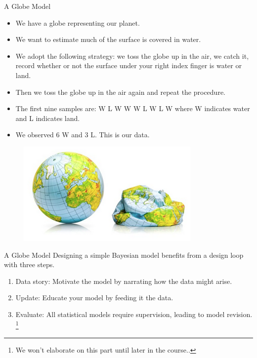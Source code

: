 \documentclass[handout]{beamer}
\begin{document}
\begin{frame}{A Globe Model}
\scriptsize{
\begin{itemize}

\item We have a globe representing our planet. 
\item We want to estimate much of the surface is covered in water. 
\item We adopt the following strategy: we toss the globe up in the air, we catch it, record whether or not the surface under your right index finger is water or
land. 
\item Then we toss the globe up in the air again and repeat the procedure.
\item The first nine samples are:
W L W W W L W L W
where W indicates water and L indicates land.
\item We observed 6 W and 3 L. This is our data.
\end{itemize}
 } 
 
\scriptsize{
\begin{figure}[h!]
	\centering
	\includegraphics[scale=0.4]{pics/globe.png}
\end{figure}
 }  

\end{frame}

\begin{frame}{A Globe Model}
Designing a simple Bayesian model benefits from a design loop with three steps.
\begin{enumerate}
 \item Data story: Motivate the model by narrating how the data might arise.
\item Update: Educate your model by feeding it the data.
\item Evaluate: All statistical models require supervision, leading to model revision. \footnote{We won't elaborate on this part until later in the course..}
\end{enumerate}

\end{frame}
\end{document}

